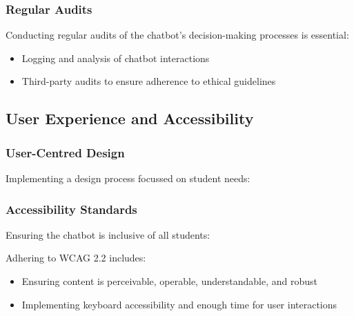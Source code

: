 \documentclass[14pt,a4paper]{article}
\begin{document}
\begin{multicols}{2}
\subsubsection{Regular Audits}
Conducting regular audits of the chatbot's decision-making processes \textit{\parencite{AIEthicsGuidelines2024}} is essential:
\begin{itemize}
    \item Logging and analysis of chatbot interactions
    \item Third-party audits to ensure adherence to ethical guidelines
\end{itemize}

\newpage

\subsection{User Experience and Accessibility}
\subsubsection{User-Centred Design}
Implementing a design process focussed on student needs:


\subsubsection{Accessibility Standards}
Ensuring the chatbot is inclusive of all students:

Adhering to WCAG 2.2 \textit{\parencite{W3C2023}} includes:
\begin{itemize}
    \item Ensuring content is perceivable, operable, understandable, and robust
    \item Implementing keyboard accessibility and enough time for user interactions
\end{itemize}



\end{multicols}
\end{document}
